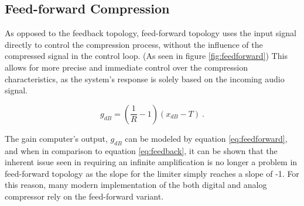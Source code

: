 \documentclass[10pt]{article}
\begin{document}
\begin{multicols*}{2}
                \vspace{2ex}

            \subsection{Feed-forward Compression} \label{sect:feed-forward-comp}
                As opposed to the feedback topology, feed-forward topology uses the input signal directly to control the compression process, without the influence of the compressed signal in the control loop. (As seen in figure \ref{fig:feedforward}) This allows for more precise and immediate control over the compression characteristics, as the system's response is solely based on the incoming audio signal.\par

                    \begin{equation}\label{eq:feedforward}
                        g_{dB}=(\frac{1}{R}-1)(x_{dB}-T)\ .
                    \end{equation}
                    
                \noindent The gain computer's output, $g_{dB}$ can be modeled by equation \ref{eq:feedforward}, and when in comparison to equation \ref{eq:feedback}, it can be shown that the inherent issue seen in requiring an infinite amplification is no longer a problem in feed-forward topology as the slope for the limiter simply reaches a slope of -1. For this reason, many modern implementation of the both digital and analog compressor rely on the feed-forward variant.

                \vspace{2ex}

                    \noindent
                    \begin{minipage}{\linewidth}

                        \centering

\end{minipage}
\end{multicols*}
\end{document}
